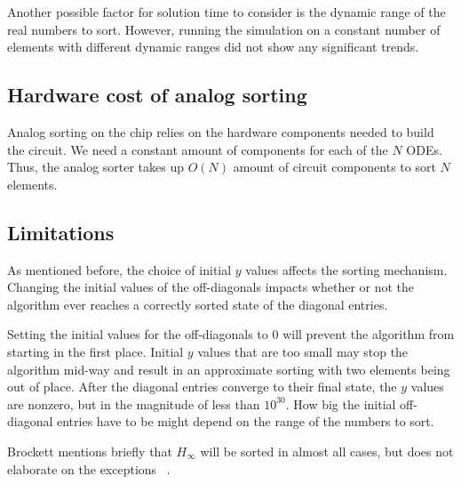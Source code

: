 Another possible factor for solution time to consider is the dynamic range of the real numbers to sort. However, running the simulation on a constant number of elements with different dynamic ranges did not show any significant trends.

\subsection{Hardware cost of analog sorting}

Analog sorting on the chip relies on the hardware components needed to build the circuit. 
We need a constant amount of components for each of the $N$ ODEs.
Thus, the analog sorter takes up $O(N)$ amount of circuit components to sort $N$ elements.


\subsection{Limitations}

As mentioned before, the choice of initial $y$ values affects the sorting mechanism. Changing the initial values of the off-diagonals impacts whether or not the algorithm ever reaches a correctly sorted state of the diagonal entries.

Setting the initial values for the off-diagonals to $0$ will prevent the algorithm from starting in the first place. Initial $y$ values that are too small may stop the algorithm mid-way and result in an approximate sorting with two elements being out of place. After the diagonal entries converge to their final state, the $y$ values are nonzero, but in the magnitude of less than $10^{30}$. How big the initial off-diagonal entries have to be might depend on the range of the numbers to sort.

Brockett mentions briefly that $H_\infty$ will be sorted in almost all cases, but does not elaborate on the exceptions ~\cite{brockett}.




